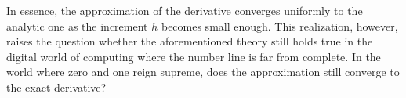 In essence, the approximation of the derivative converges uniformly to the analytic one as the increment \(h\) becomes small enough. This realization, however, raises the question whether the aforementioned theory still holds true in the digital world of computing where the number line is far from complete. In the world where zero and one reign supreme, does the approximation still converge to the exact derivative?\\